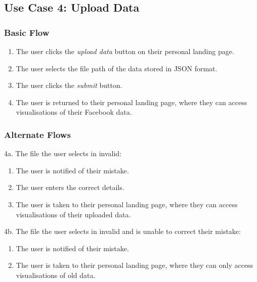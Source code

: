 \documentclass[12pt,onecolumn]{article}
\begin{document}
	\subsection{Use Case 4: Upload Data}

		\subsubsection{Basic Flow}

		\begin{enumerate}
			\item The user clicks the \emph{upload data} button on their personal landing page.

			\item The user selects the file path of the data stored in JSON format.

			\item The user clicks the \emph{submit} button.

			\item The user is returned to their personal landing page, where they can access visualisations of their Facebook data.		

		\end{enumerate}

		\subsubsection{Alternate Flows}

		4a. The file the user selects in invalid:

		\begin{enumerate}
			\item The user is notified of their mistake.

			\item The user enters the correct details.

			\item The user is taken to their personal landing page, where they can access visualisations of their uploaded data.
		\end{enumerate}

		4b. The file the user selects in invalid and is unable to correct their mistake:

		\begin{enumerate}
			\item The user is notified of their mistake.

			\item The user is taken to their personal landing page, where they can only access visualisations of old data.
		\end{enumerate}
\end{document}
